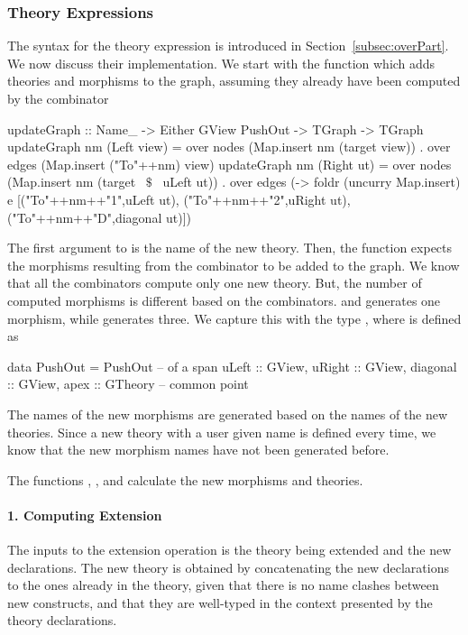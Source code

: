 \subsubsection{Theory Expressions}
The syntax for the theory expression is introduced in Section~\ref{subsec:overPart}. We now discuss their implementation. 
We start with the function  which adds theories and morphisms to the graph, assuming they already have been computed by the combinator
\begin{hscode}
updateGraph ::   Name_ -> Either GView PushOut -> TGraph -> TGraph
updateGraph nm (Left view) =
  over nodes (Map.insert nm (target view)) .
  over edges (Map.insert ("To"++nm) view)
updateGraph nm (Right ut) =
  over nodes (Map.insert nm (target ~$\$$~ uLeft ut)) .
  over edges (\e -> foldr (uncurry Map.insert) e 
                        [("To"++nm++"1",uLeft ut),
                         ("To"++nm++"2",uRight ut),
                         ("To"++nm++"D",diagonal ut)])
\end{hscode}
The first argument to  is the name of the new theory. Then, the function expects the morphisms resulting from the combinator to be added to the graph. We know that all the combinators compute only one new theory. 
But, the number of computed morphisms is different based on the combinators.  and  generates one morphism, while  generates three. We capture this with the type , where  is defined as 
\begin{hscode}
data PushOut = PushOut { -- of a span
  uLeft    :: GView,
  uRight   :: GView,
  diagonal :: GView,
  apex     :: GTheory } -- common point
\end{hscode}
The names of the new morphisms are generated based on the names of the new theories. Since a new theory with a user given name is defined every time, we know that the new morphism names have not been generated before. 

The functions , , and  calculate the new morphisms and theories. 

\paragraph{1. Computing Extension}
The inputs to the extension operation is the theory being extended and the new declarations. The new theory is obtained by concatenating the new declarations to the ones already in the theory, given that there is no name clashes between new constructs, and that they are well-typed in the context presented by the theory declarations. 

